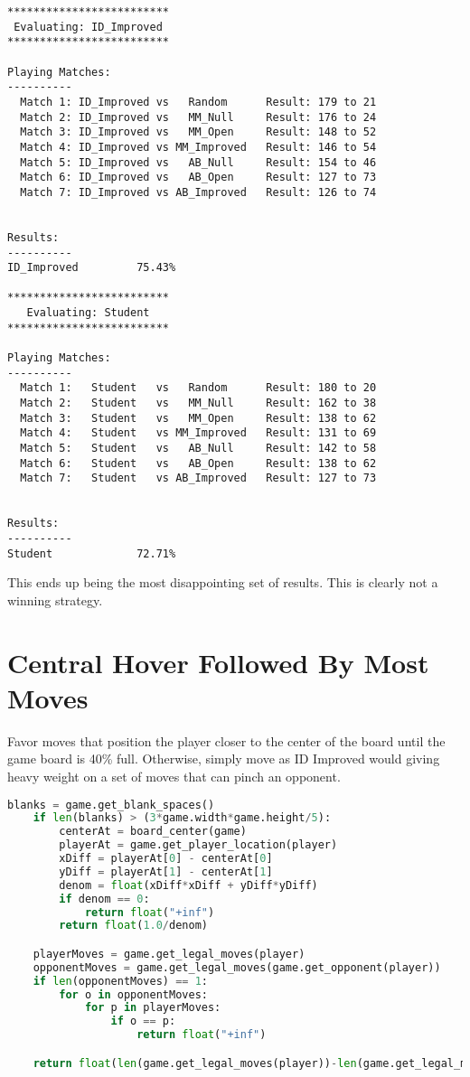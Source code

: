 \documentclass[10pt, a4paper]{article}
\begin{document}
\begin{verbatim}
*************************
 Evaluating: ID_Improved 
*************************

Playing Matches:
----------
  Match 1: ID_Improved vs   Random    	Result: 179 to 21
  Match 2: ID_Improved vs   MM_Null   	Result: 176 to 24
  Match 3: ID_Improved vs   MM_Open   	Result: 148 to 52
  Match 4: ID_Improved vs MM_Improved 	Result: 146 to 54
  Match 5: ID_Improved vs   AB_Null   	Result: 154 to 46
  Match 6: ID_Improved vs   AB_Open   	Result: 127 to 73
  Match 7: ID_Improved vs AB_Improved 	Result: 126 to 74


Results:
----------
ID_Improved         75.43%

*************************
   Evaluating: Student   
*************************

Playing Matches:
----------
  Match 1:   Student   vs   Random    	Result: 180 to 20
  Match 2:   Student   vs   MM_Null   	Result: 162 to 38
  Match 3:   Student   vs   MM_Open   	Result: 138 to 62
  Match 4:   Student   vs MM_Improved 	Result: 131 to 69
  Match 5:   Student   vs   AB_Null   	Result: 142 to 58
  Match 6:   Student   vs   AB_Open   	Result: 138 to 62
  Match 7:   Student   vs AB_Improved 	Result: 127 to 73


Results:
----------
Student             72.71%
\end{verbatim}

This ends up being the most disappointing set of results.  This is clearly not
a winning strategy.

\section{Central Hover Followed By Most Moves}

Favor moves that position the player closer to the center of the board until the game board is 40\% full.
Otherwise, simply move as ID Improved would giving heavy weight on a set of moves that can pinch an opponent.

\begin{lstlisting}[language=Python]
    blanks = game.get_blank_spaces()
    if len(blanks) > (3*game.width*game.height/5):
        centerAt = board_center(game)
        playerAt = game.get_player_location(player)
        xDiff = playerAt[0] - centerAt[0]
        yDiff = playerAt[1] - centerAt[1]
        denom = float(xDiff*xDiff + yDiff*yDiff)
        if denom == 0:
            return float("+inf")
        return float(1.0/denom)

    playerMoves = game.get_legal_moves(player)
    opponentMoves = game.get_legal_moves(game.get_opponent(player))
    if len(opponentMoves) == 1:
        for o in opponentMoves:
            for p in playerMoves:
                if o == p:
                    return float("+inf")

    return float(len(game.get_legal_moves(player))-len(game.get_legal_moves(game.get_opponent(player))))
\end{lstlisting}
\end{document}

